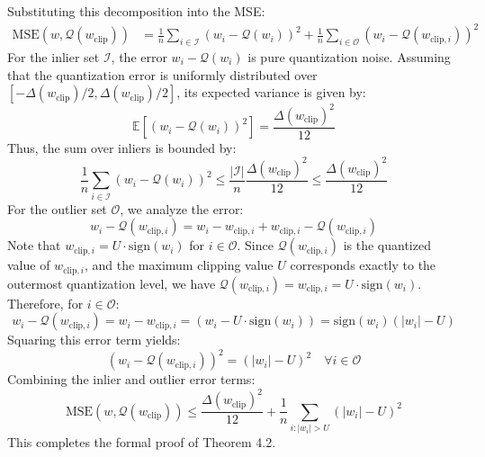 \documentclass{article}
\theoremstyle{plain}
\theoremstyle{definition}
\theoremstyle{remark}
\begin{document}
Substituting this decomposition into the MSE:
\begin{align}
    \text{MSE}(w, \mathcal{Q}(w_{\text{clip}})) &= \frac{1}{n} \sum_{i \in \mathcal{I}} (w_i - \mathcal{Q}(w_i))^2 + \frac{1}{n} \sum_{i \in \mathcal{O}} (w_i - \mathcal{Q}(w_{\text{clip}, i}))^2
\end{align}
For the inlier set $\mathcal{I}$, the error $w_i - \mathcal{Q}(w_i)$ is pure quantization noise. Assuming that the quantization error is uniformly distributed over $[-\Delta(w_{\text{clip}})/2, \Delta(w_{\text{clip}})/2]$, its expected variance is given by:
\begin{equation}
    \mathbb{E}[(w_i - \mathcal{Q}(w_i))^2] = \frac{\Delta(w_{\text{clip}})^2}{12}
\end{equation}
Thus, the sum over inliers is bounded by:
\begin{equation}
    \frac{1}{n} \sum_{i \in \mathcal{I}} (w_i - \mathcal{Q}(w_i))^2 \leq \frac{|\mathcal{I}|}{n} \frac{\Delta(w_{\text{clip}})^2}{12} \leq \frac{\Delta(w_{\text{clip}})^2}{12}
\end{equation}
For the outlier set $\mathcal{O}$, we analyze the error:
\begin{equation}
    w_i - \mathcal{Q}(w_{\text{clip}, i}) = w_i - w_{\text{clip}, i} + w_{\text{clip}, i} - \mathcal{Q}(w_{\text{clip}, i})
\end{equation}
Note that $w_{\text{clip}, i} = U \cdot \text{sign}(w_i)$ for $i \in \mathcal{O}$. Since $\mathcal{Q}(w_{\text{clip}, i})$ is the quantized value of $w_{\text{clip}, i}$, and the maximum clipping value $U$ corresponds exactly to the outermost quantization level, we have $\mathcal{Q}(w_{\text{clip}, i}) = w_{\text{clip}, i} = U \cdot \text{sign}(w_i)$.
Therefore, for $i \in \mathcal{O}$:
\begin{equation}
    w_i - \mathcal{Q}(w_{\text{clip}, i}) = w_i - w_{\text{clip}, i} = (w_i - U \cdot \text{sign}(w_i)) = \text{sign}(w_i)(|w_i| - U)
\end{equation}
Squaring this error term yields:
\begin{equation}
    (w_i - \mathcal{Q}(w_{\text{clip}, i}))^2 = (|w_i| - U)^2 \quad \forall i \in \mathcal{O}
\end{equation}
Combining the inlier and outlier error terms:
\begin{equation}
    \text{MSE}(w, \mathcal{Q}(w_{\text{clip}})) \leq \frac{\Delta(w_{\text{clip}})^2}{12} + \frac{1}{n} \sum_{i: |w_i| > U} (|w_i| - U)^2
\end{equation}
This completes the formal proof of Theorem 4.2.
\end{document}
